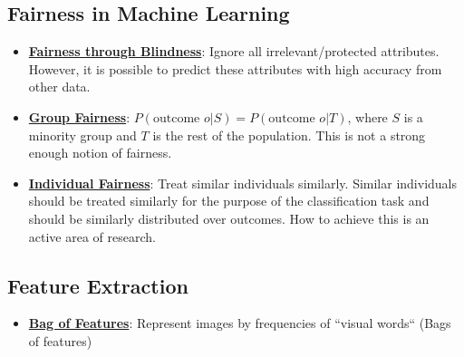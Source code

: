 \documentclass{article}%
\begin{document}
\subsection{Fairness in Machine Learning}%
\label{subsec:FairnessinMachineLearning}%
\begin{itemize}[leftmargin=*]%
\item \href{https://purdue.brightspace.com/d2l/common/assets/pdfjs-d2l-dist/1.0.14-legacy/web/viewer.html?file=\%2Fcontent\%2Fenforced\%2F1095467-wl.202510.CS.24300.001\%2F16L2-ethics.pdf\%3Fou\%3D1095467\&lang=en-us\&container=d2l-fileviewer-rendered-pdf\&fullscreen=d2l-fileviewer-rendered-pdf-dialog\&height=667#page=25}{\textbf{Fairness through Blindness}}: Ignore all irrelevant/protected attributes. However, it is possible to predict these attributes with high accuracy from other data.%
\item \href{https://purdue.brightspace.com/d2l/common/assets/pdfjs-d2l-dist/1.0.14-legacy/web/viewer.html?file=\%2Fcontent\%2Fenforced\%2F1095467-wl.202510.CS.24300.001\%2F16L2-ethics.pdf\%3Fou\%3D1095467\&lang=en-us\&container=d2l-fileviewer-rendered-pdf\&fullscreen=d2l-fileviewer-rendered-pdf-dialog\&height=667#page=26}{\textbf{Group Fairness}}: $P(\text{outcome } o | S) = P(\text{outcome } o | T)$, where $S$ is a minority group and $T$ is the rest of the population. This is not a strong enough notion of fairness.%
\item \href{https://purdue.brightspace.com/d2l/common/assets/pdfjs-d2l-dist/1.0.14-legacy/web/viewer.html?file=\%2Fcontent\%2Fenforced\%2F1095467-wl.202510.CS.24300.001\%2F16L2-ethics.pdf\%3Fou\%3D1095467\&lang=en-us\&container=d2l-fileviewer-rendered-pdf\&fullscreen=d2l-fileviewer-rendered-pdf-dialog\&height=667#page=27}{\textbf{Individual Fairness}}: Treat similar individuals similarly. Similar individuals should be treated similarly for the purpose of the classification task and should be similarly distributed over outcomes. How to achieve this is an active area of research.%
\end{itemize}

%
\subsection{Feature Extraction}%
\label{subsec:FeatureExtraction}%
\begin{itemize}[leftmargin=*]%
\item \href{https://purdue.brightspace.com/d2l/common/assets/pdfjs-d2l-dist/1.0.14-legacy/web/viewer.html?file=\%2Fcontent\%2Fenforced\%2F1095467-wl.202510.CS.24300.001\%2F07L2-Vision.pdf\%3Fou\%3D1095467\&lang=en-us\&container=d2l-fileviewer-rendered-pdf\&fullscreen=d2l-fileviewer-rendered-pdf-dialog\&height=667#page=16}{\textbf{Bag of Features}}: Represent images by frequencies of ``visual words`` (Bags of features)%
\end{itemize}
\end{document}
